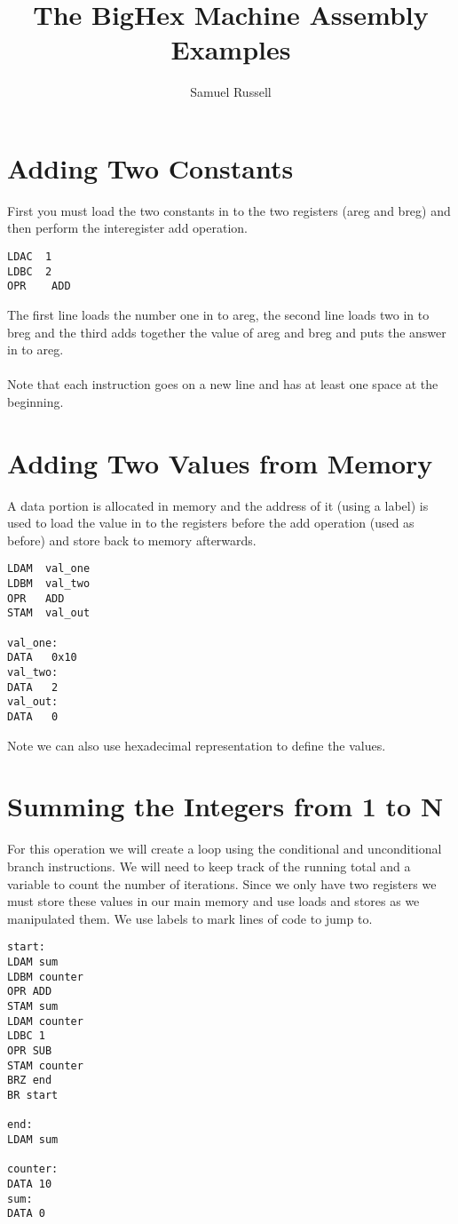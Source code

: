 \documentclass[10pt,a4paper]{article}
\author{Samuel Russell}
\title{The BigHex Machine Assembly Examples}
\begin{document}
\maketitle


\section{Adding Two Constants}

First you must load the two constants in to the two registers (areg and breg) and then perform the interegister add operation. 
\\
\begin{lstlisting}[frame=single]
LDAC  1
LDBC  2
OPR    ADD
\end{lstlisting}

The first line loads the number one in to areg, the second line loads two in to breg and the third adds together the value of areg and breg and puts the answer in to areg.
\\\\
Note that each instruction goes on a new line and has at least one space at the beginning.

\section{Adding Two Values from Memory}

A data portion is allocated in memory and the address of it (using a label) is used to load the value in to the registers before the add operation (used as before) and store back to memory afterwards.
\\
\begin{lstlisting}[frame=single]
LDAM  val_one
LDBM  val_two
OPR   ADD
STAM  val_out

val_one:
DATA   0x10
val_two:
DATA   2
val_out:
DATA   0
\end{lstlisting}

Note we can also use hexadecimal representation to define the values.
\newpage
\section{Summing the Integers from 1 to N}

For this operation we will create a loop using the conditional and unconditional branch instructions. We will need to keep track of the running total and a variable to count the number of iterations. Since we only have two registers we must store these values in our main memory and use loads and stores as we manipulated them.
We use labels to mark lines of code to jump to.
\\
\begin{lstlisting}[frame=single]
start:
LDAM sum
LDBM counter
OPR ADD
STAM sum
LDAM counter
LDBC 1
OPR SUB
STAM counter
BRZ end
BR start

end:
LDAM sum

counter:
DATA 10
sum:
DATA 0
\end{lstlisting}
\end{document}
